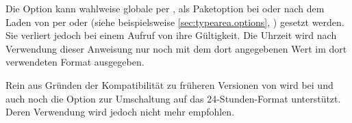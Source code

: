 Die Option kann wahlweise globale per
, als Paketoption bei
 oder nach dem Laden von
 per  oder
 (siehe beispielsweise
\autoref{sec:typearea.options}, )
gesetzt werden. Sie verliert jedoch bei einem Aufruf von
 ihre Gültigkeit. Die Uhrzeit wird nach
Verwendung dieser Anweisung nur noch mit dem dort angegebenen Wert im dort
verwendeten Format ausgegeben.

Rein aus Gründen der Kompatibilität zu früheren Versionen
von  wird bei  und
 auch noch die Option  zur
Umschaltung auf das 24-Stunden-Format unterstützt. Deren Verwendung wird
jedoch nicht mehr empfohlen.%
\EndIndexGroup
%
\EndIndexGroup


